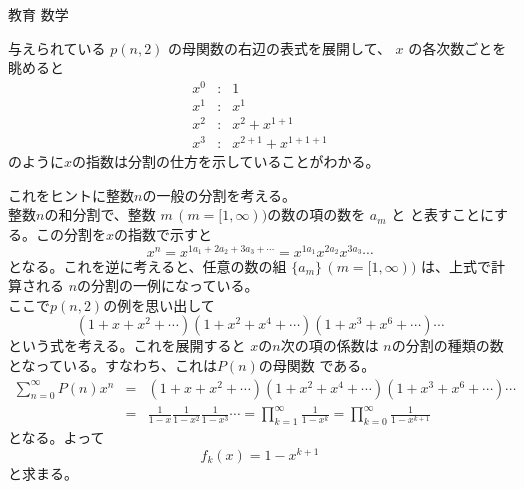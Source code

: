 \documentclass[fleqn]{jbook}
\begin{document}
\begin{answer}{教育 数学}{}
\begin{subanswers}
\begin{subsubanswers}
  \SubSubAnswer
    与えられている $p(n,2)$ の母関数の右辺の表式を展開して、
    $x$ の各次数ごとを眺めると
%
    \begin{eqnarray*}
      x^0 &:& 1 \\
      x^1 &:& x^{1} \\
      x^2 &:& x^{2} + x^{1+1} \\
      x^3 &:& x^{2+1} + x^{1+1+1}
    \end{eqnarray*}
%
    のように$x$の指数は分割の仕方を示していることがわかる。

    これをヒントに整数$n$の一般の分割を考える。\\
%
    整数$n$の和分割で、整数 $m\,(m=[1,\infty))$の数の項の数を $a_m$ と
    と表すことにする。この分割を$x$の指数で示すと
%
    \[ x^n = x^{1a_1+2a_2+3a_3+\cdots}%
           = x^{1a_1}x^{2a_2}x^{3a_3} \cdots \]
%
    となる。これを逆に考えると、任意の数の組 $\{a_m\}\,(m=[1,\infty))$
    は、上式で計算される $n$の分割の一例になっている。\\
%
    ここで$p(n,2)$の例を思い出して
%
    \[ (1+x+x^2+\cdots)(1+x^2+x^4+\cdots)(1+x^3+x^6+\cdots)\cdots\]
%
    という式を考える。これを展開すると $x$の$n$次の項の係数は
    $n$の分割の種類の数となっている。すなわち、これは$P(n)$の母関数
    である。
%
    \begin{eqnarray*}
      \sum_{n=0}^{\infty} P(n)x^n%
       &=&(1+x+x^2+\cdots)(1+x^2+x^4+\cdots)(1+x^3+x^6+\cdots)\cdots\\
       &=&\frac{1}{1-x}\frac{1}{1-x^2}\frac{1}{1-x^3}\cdots%
       = \prod_{k=1}^{\infty}\frac{1}{1-x^k} = \prod_{k=0}^{\infty}\frac{1}{1-x^{k+1}}
    \end{eqnarray*}
%
    となる。よって
%
    \[ f_k(x) = 1-x^{k+1} \]
%
    と求まる。

  \end{subsubanswers}

\end{subanswers}
\end{answer}
\end{document}
